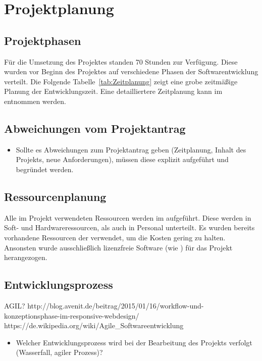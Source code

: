 \section{Projektplanung} 
\label{sec:Projektplanung}


\subsection{Projektphasen}
\label{sec:Projektphasen}

Für die Umsetzung des Projektes standen 70 Stunden zur Verfügung. Diese wurden vor
Beginn des Projektes auf verschiedene Phasen der Softwarentwicklung verteilt.
Die Folgende Tabelle~\ref{tab:Zeitplanung} zeigt eine grobe zeitmäßige Planung
der Entwicklungszeit.
Eine detailliertere Zeitplanung kann im  entnommen werden.




\subsection{Abweichungen vom Projektantrag}
\label{sec:AbweichungenProjektantrag}

\begin{itemize}
	\item Sollte es Abweichungen zum Projektantrag geben (\zB Zeitplanung, Inhalt des Projekts, neue Anforderungen), müssen diese explizit aufgeführt und begründet werden.
\end{itemize}


\subsection{Ressourcenplanung}
\label{sec:Ressourcenplanung}
Alle im Projekt verwendeten Ressourcen werden im 
aufgeführt. Diese werden in Soft- und Hardwareressourcen, als auch in Personal
unterteilt. Es wurden bereits vorhandene Ressourcen der \mh verwendet, um die
Kosten gering zu halten. Ansonsten wurde ausschließlich lizenzfreie Software (wie \zB
{}) für das Projekt herangezogen.



\subsection{Entwicklungsprozess}
\label{sec:Entwicklungsprozess}
AGIL?
http://blog.avenit.de/beitrag/2015/01/16/workflow-und-konzeptionsphase-im-responsive-webdesign/
https://de.wikipedia.org/wiki/Agile_Softwareentwicklung
\begin{itemize}
	\item Welcher Entwicklungsprozess wird bei der Bearbeitung des Projekts verfolgt (\zB Wasserfall, agiler Prozess)?
\end{itemize}
